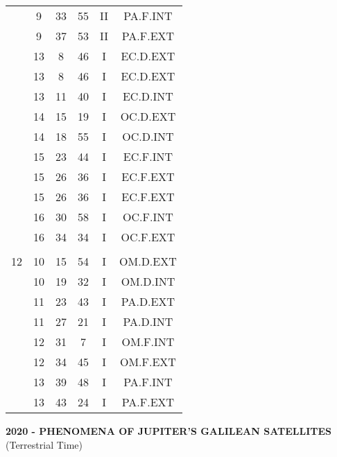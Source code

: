 \documentclass[12pt, a4paper]{article}
\begin{document}
\begin{multicols}{3}
{\begin{tabular}{c c c c c c}
	 	 	 	 & 9 & 33 & 55 & II & PA.F.INT\\%
	 	 	 	 & 9 & 37 & 53 & II & PA.F.EXT\\%
	 	 	 	 & 13 & 8 & 46 & I & EC.D.EXT\\%
	 	 	 	 & 13 & 8 & 46 & I & EC.D.EXT\\%
	 	 	 	 & 13 & 11 & 40 & I & EC.D.INT\\%
	 	 	 	 & 14 & 15 & 19 & I & OC.D.EXT\\%
	 	 	 	 & 14 & 18 & 55 & I & OC.D.INT\\%
	 	 	 	 & 15 & 23 & 44 & I & EC.F.INT\\%
	 	 	 	 & 15 & 26 & 36 & I & EC.F.EXT\\%
	 	 	 	 & 15 & 26 & 36 & I & EC.F.EXT\\%
	 	 	 	 & 16 & 30 & 58 & I & OC.F.INT\\%
	 	 	 	 & 16 & 34 & 34 & I & OC.F.EXT\\%
	 	 	 	 & & & & & \\%
	 	 	 	12 & 10 & 15 & 54 & I & OM.D.EXT\\%
	 	 	 	 & 10 & 19 & 32 & I & OM.D.INT\\%
	 	 	 	 & 11 & 23 & 43 & I & PA.D.EXT\\%
	 	 	 	 & 11 & 27 & 21 & I & PA.D.INT\\%
	 	 	 	 & 12 & 31 & 7 & I & OM.F.INT\\%
	 	 	 	 & 12 & 34 & 45 & I & OM.F.EXT\\%
	 	 	 	 & 13 & 39 & 48 & I & PA.F.INT\\%
	 	 	 	 & 13 & 43 & 24 & I & PA.F.EXT\\%
	 	 \end{tabular}
 	}
\end{multicols}
\pagebreak
\textbf{2020 - PHENOMENA OF JUPITER'S GALILEAN SATELLITES}\\(Terrestrial Time) 
\end{document}
